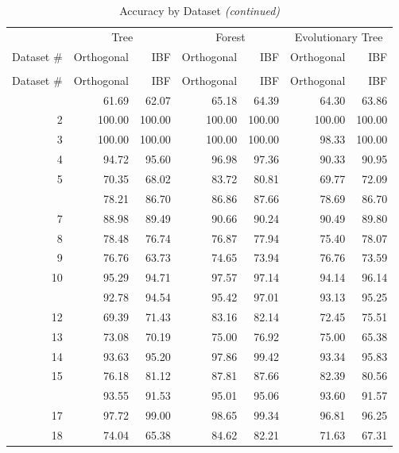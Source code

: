 \documentclass[]{elsarticle} %
\begin{document}
\begin{longtable}[t]{rrrrrrr}
\caption{\label{tab:accuracy-by-dataset-table}\label{tab:accuracy-by-dataset}Accuracy by Dataset}\\
\toprule
\multicolumn{1}{c}{ } & \multicolumn{2}{c}{Tree} & \multicolumn{2}{c}{Forest} & \multicolumn{2}{c}{Evolutionary Tree} \\
\cmidrule(l{2pt}r{2pt}){2-3} \cmidrule(l{2pt}r{2pt}){4-5} \cmidrule(l{2pt}r{2pt}){6-7}
Dataset \# & Orthogonal & IBF & Orthogonal & IBF & Orthogonal & IBF\\
\midrule
\endfirsthead
\caption[]{\label{tab:accuracy-by-dataset}Accuracy by Dataset \textit{(continued)}}\\
\toprule
Dataset \# & Orthogonal & IBF & Orthogonal & IBF & Orthogonal & IBF\\
\midrule
\endhead
\
\endfoot
\bottomrule
\endlastfoot
1 & 61.69 & 62.07 & 65.18 & 64.39 & 64.30 & 63.86\\
2 & 100.00 & 100.00 & 100.00 & 100.00 & 100.00 & 100.00\\
3 & 100.00 & 100.00 & 100.00 & 100.00 & 98.33 & 100.00\\
4 & 94.72 & 95.60 & 96.98 & 97.36 & 90.33 & 90.95\\
5 & 70.35 & 68.02 & 83.72 & 80.81 & 69.77 & 72.09\\
\addlinespace
6 & 78.21 & 86.70 & 86.86 & 87.66 & 78.69 & 86.70\\
7 & 88.98 & 89.49 & 90.66 & 90.24 & 90.49 & 89.80\\
8 & 78.48 & 76.74 & 76.87 & 77.94 & 75.40 & 78.07\\
9 & 76.76 & 63.73 & 74.65 & 73.94 & 76.76 & 73.59\\
10 & 95.29 & 94.71 & 97.57 & 97.14 & 94.14 & 96.14\\
\addlinespace
11 & 92.78 & 94.54 & 95.42 & 97.01 & 93.13 & 95.25\\
12 & 69.39 & 71.43 & 83.16 & 82.14 & 72.45 & 75.51\\
13 & 73.08 & 70.19 & 75.00 & 76.92 & 75.00 & 65.38\\
14 & 93.63 & 95.20 & 97.86 & 99.42 & 93.34 & 95.83\\
15 & 76.18 & 81.12 & 87.81 & 87.66 & 82.39 & 80.56\\
\addlinespace
16 & 93.55 & 91.53 & 95.01 & 95.06 & 93.60 & 91.57\\
17 & 97.72 & 99.00 & 98.65 & 99.34 & 96.81 & 96.25\\
18 & 74.04 & 65.38 & 84.62 & 82.21 & 71.63 & 67.31\\

\end{longtable}
\end{document}

